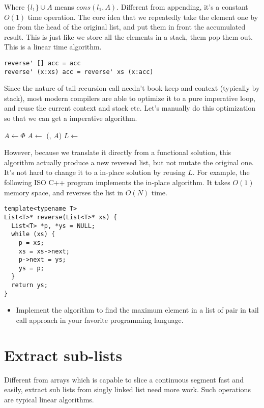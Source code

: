 \documentclass{article}
\begin{document}
Where $\{l_1\} \cup A$ means $cons(l_1, A)$. Different from appending, it's a constant $O(1)$ time operation. The core idea
that we repeatedly take the element one by one from the head of the original list, and put them in front the accumulated
result. This is just like we store all the elements in a stack, them pop them out. This is a linear time algorithm.

\begin{lstlisting}
reverse' [] acc = acc
reverse' (x:xs) acc = reverse' xs (x:acc)
\end{lstlisting}

Since the nature of tail-recursion call needn't book-keep and context (typically by stack), most modern compilers are
able to optimize it to a pure imperative loop, and reuse the current context and stack etc. Let's manually do this
optimization so that we can get a imperative algorithm.

\begin{algorithmic}
  \State $A \gets \Phi$
    \State $A \gets $ (, $A$)
    \State $L \gets$ 
  \EndWhile
\EndFunction
\end{algorithmic}

However, because we translate it directly from a functional solution, this algorithm actually produce a new reversed list,
but not mutate the original one. It's not hard to change it to a in-place solution by reusing $L$. For example, the following
ISO C++ program implements the in-place algorithm. It takes $O(1)$ memory space, and reverses the list in $O(N)$ time.

\lstset{language=C++}
\begin{lstlisting}
template<typename T>
List<T>* reverse(List<T>* xs) {
  List<T> *p, *ys = NULL;
  while (xs) {
    p = xs;
    xs = xs->next;
    p->next = ys;
    ys = p;
  }
  return ys;
}
\end{lstlisting}

\begin{Exercise}
\begin{itemize}
\item Implement the algorithm to find the maximum element in a list of pair in tail call approach in your favorite programming
language.
\end{itemize}
\end{Exercise}

\section{Extract sub-lists}
Different from arrays which is capable to slice a continuous segment fast and easily, extract sub lists from singly linked
list need more work. Such operations are typical linear algorithms.
\end{document}
